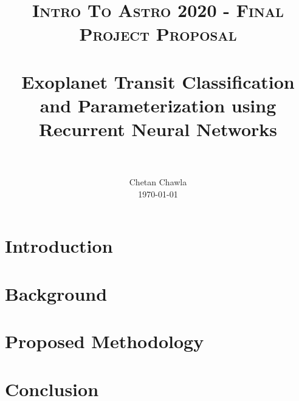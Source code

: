 \documentclass[paper=letterpaper, fontsize=11pt]{scrartcl}
\title{
		\usefont{OT1}{bch}{b}{n}
		\normalfont \normalsize \textsc{Intro To Astro 2020 - Final Project Proposal} \\ [25pt]
		\horrule{0.5pt} \\[0.4cm]
		\huge Exoplanet Transit Classification and Parameterization using Recurrent Neural Networks \\
		\horrule{2pt} \\[0.5cm]
}
\author{
	\normalfont 				\normalsize
        Chetan Chawla	\\		\normalsize
        \today
}
\date{}
\numberwithin{equation}{section}		%
\numberwithin{table}{section}			%
\begin{document}
\maketitle

\section{Introduction}


\section{Background}


\section{Proposed Methodology}


\section{Conclusion}




\end{document}
